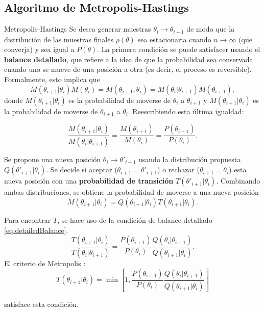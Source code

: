 \documentclass{beamer}
\begin{document}
	\subsection{Algoritmo de Metropolis-Hastings}
	\begin{frame}[allowframebreaks]{Metropolis-Hastings}
Se desea generar muestras $\theta_i\rightarrow\theta_{i+1}$ de modo que la distribución de las muestras finales $\rho(\theta)$ sea estacionaria cuando $n\rightarrow\infty$ (que converja) y sea igual a $P(\theta)$. La primera condición se puede satisfacer usando el \textbf{balance detallado}, que refiere a la idea de que la probabilidad sea conservada cuando uno se mueve de una posición a otra (es decir, el proceso es reversible). Formalmente, esto implica que
	$$M(\theta_{i+1}|\theta_i)M(\theta_i)=M(\theta_{i+1},\theta_{i})=M(\theta_i|\theta_{i+1})M(\theta_{i+1}),$$
	donde $M(\theta_{i+1}|\theta_i)$ es la probabilidad de moverse de $\theta_i$ a $\theta_{i+1}$ y $M(\theta_{i+1}|\theta_i)$ es la probabilidad de moverse de $\theta_{i+1}$ a $\theta_i$. Reescribiendo esta última igualdad:
	
	\begin{equation}\label{eq:detailedBalance}
	\frac{M(\theta_{i+1}|\theta_i)}{M(\theta_{i}|\theta_{i+1})}=\frac{M(\theta_{i+1})}{M(\theta_i)}=\frac{P(\theta_{i+1})}{P(\theta_i)}.
	\end{equation}
	
	Se propone una nueva posición $\theta_i\rightarrow\theta'_{i+1}$ usando la distribución propuesta $Q(\theta'_{i+1}|\theta_i)$. Se decide si aceptar ($\theta_{i+1}=\theta'_{i+1}$) o rechazar ($\theta_{i+1}=\theta_{i}$) esta nueva posición con una \textbf{probabilidad de transición} $T(\theta'_{i+1}|\theta_i)$. Combinando ambas distribuciones, se obtiene la probabilidad de moverse a una nueva posición
	$$M(\theta_{i+1}|\theta_i)=Q(\theta_{i+1}|\theta_i)T(\theta_{i+1}|\theta_i).$$
	
	Para encontrar $T$, se hace uso de la condición de balance detallado \eqref{eq:detailedBalance}.
	$$\frac{T(\theta_{i+1}|\theta_i)}{T(\theta_{i}|\theta_{i+1})}=\frac{P(\theta_{i+1})}{P(\theta_i)}\frac{Q(\theta_{i}|\theta_{i+1})}{Q(\theta_{i+1}|\theta_i)}.$$
	El criterio de Metropolis \cite{doi:10.1063/1.1699114}:
	$$T(\theta_{i+1}|\theta_i)=\min \left[ 1, \frac{P(\theta_{i+1})}{P(\theta_i)}\frac{Q(\theta_{i}|\theta_{i+1})}{Q(\theta_{i+1}|\theta_i)} \right]$$
	
	satisface esta condición.
	
	\end{frame}
\end{document}
